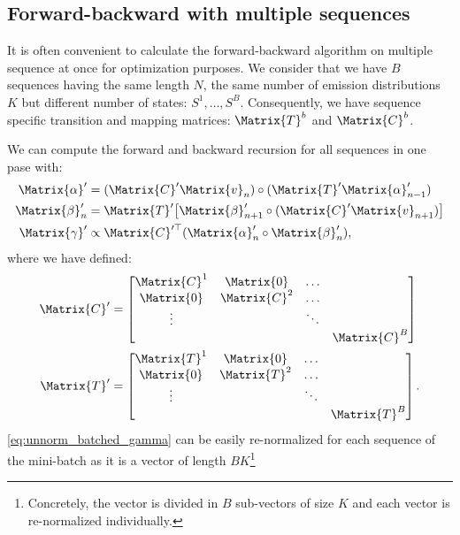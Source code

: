 \documentclass[class=article, crop=false]{standalone}
\begin{document}
\subsection{Forward-backward with multiple sequences}
It is often convenient to calculate the forward-backward algorithm on
multiple sequence at once for optimization purposes.
We consider that we have $B$ sequences having the same length $N$, the
same number of emission distributions $K$ but different number of
states: $S^1, \dots, S^B$. Consequently, we have sequence specific
transition and mapping matrices: $\Matrix{T}^b$ and $\Matrix{C}^b$.

We can compute the forward and backward recursion for all sequences
in one pase with:
\begin{align}
    \Matrix{\alpha}' &= (\Matrix{C}' \Matrix{v}_n) \circ
        (\Matrix{T}' \Matrix{\alpha}'_{n-1}) \\
    \Matrix{\beta}'_n &= \Matrix{T}' \big[ \Matrix{\beta}'_{n+1} \circ
        (\Matrix{C}' \Matrix{v}_{n+1}) \big] \\
    \Matrix{\gamma}' &\propto \Matrix{C}'^\top (\Matrix{\alpha}'_n \circ
        \Matrix{\beta}'_n) \label{eq:unnorm_batched_gamma},
\end{align}
where we have defined:
\begin{align}
    \Matrix{C}' &= \begin{bmatrix}
        \Matrix{C}^1 & \Matrix{0} & \dots \\
        \Matrix{0} & \Matrix{C}^2 & \dots \\
        \vdots & & \ddots & \\
               & &  & \Matrix{C}^B
    \end{bmatrix} \\
    \Matrix{T}' &= \begin{bmatrix}
        \Matrix{T}^1 & \Matrix{0} & \dots \\
        \Matrix{0} & \Matrix{T}^2 & \dots \\
        \vdots & & \ddots & \\
               & &  & \Matrix{T}^B
    \end{bmatrix}.
\end{align}
\eqref{eq:unnorm_batched_gamma} can be easily re-normalized for each
sequence of the mini-batch as it is a vector of length $BK$\footnote{
Concretely, the vector is divided in $B$ sub-vectors of size $K$ and
each vector is re-normalized individually.}
\end{document}
